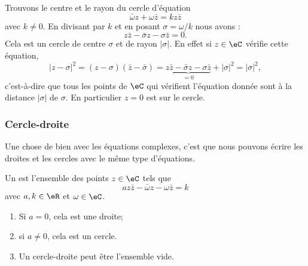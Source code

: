 \begin{example}
    Trouvons le centre et le rayon du cercle d'équation
    \begin{equation}
        \bar\omega z+\omega\bar z=kz\bar z
    \end{equation}
    avec \( k\neq 0\). En divisant par \( k\) et en posant \( \sigma=\omega/k\) nous avons :
    \begin{equation}
        z\bar z-\bar\sigma z-\sigma\bar z=0.
    \end{equation}
    Cela est un cercle de centre \( \sigma\) et de rayon \( | \sigma |\). En effet si \( z\in \eC\) vérifie cette équation,
    \begin{equation}
        | z-\sigma |^2=(z-\sigma)(\bar z-\bar \sigma)=\underbrace{z\bar z-\bar \sigma z-\sigma \bar z}_{=0}+| \sigma |^2=| \sigma |^2,
    \end{equation}
    c'est-à-dire que tous les points de \( \eC\) qui vérifient l'équation donnée sont à la distance \( | \sigma |\) de \( \sigma\). En particulier \( z=0\) est sur le cercle.
\end{example}

\subsubsection{Cercle-droite}

Une chose de bien avec les équations complexes, c'est que nous pouvons écrire les droites et les cercles avec le même type d'équations.

\begin{lemmaDef}     \label{LEMooHKHOooHpBuBZ}
    Un  est l'ensemble des points \( z\in \eC\) tels que
    \begin{equation}        \label{EQooUJAKooEVQNqa}
        az\bar z-\bar\omega z-\omega\bar z=k
    \end{equation}
    avec \( a,k\in \eR\) et \( \omega\in \eC\).
    \begin{enumerate}
        \item
            Si \( a=0\), cela est une droite;
        \item
            si \( a\neq 0\), cela est un cercle.
        \item
            Un cercle-droite peut être l'ensemble vide.
    \end{enumerate}
\end{lemmaDef}

